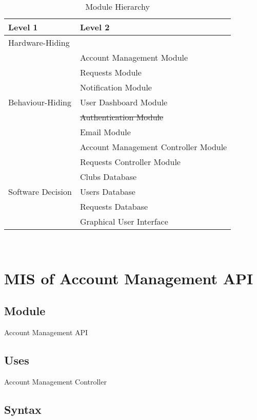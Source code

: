 \documentclass[12pt, titlepage]{article}
\begin{document}
\begin{table}[h!]
\centering
\begin{tabular}{p{} p{}}
\toprule
\textbf{Level 1} & \textbf{Level 2}\\
\midrule

{Hardware-Hiding} & ~ \\
\midrule

\multirow{7}{0.3\textwidth}{Behaviour-Hiding} 
& Account Management Module\\
& Requests Module\\
& Notification Module\\
& User Dashboard Module\\
& \st{Authentication Module}\\ 
& Email Module\\
& Account Management Controller Module\\
& Requests Controller Module\\
\midrule

\multirow{3}{0.3\textwidth}{Software Decision} 
& Clubs Database\\
& Users Database\\
& Requests Database\\
& Graphical User Interface\\
\bottomrule

\end{tabular}
\caption{Module Hierarchy}
\label{TblMH}
\end{table}

\newpage
~\newpage

\section{MIS of Account Management API} \label{AccountManagementAPI}

\subsection{Module}
Account Management API

\subsection{Uses}
Account Management Controller

\subsection{Syntax}
\end{document}
